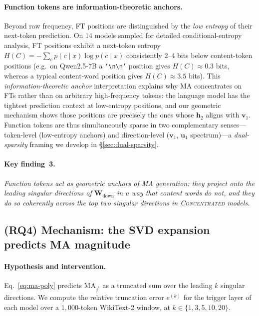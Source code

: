\documentclass{article}
\newcommand{\Wdown}{\mathbf{W}_{\text{down}}}
\newcommand{\ma}{\mathrm{MA}}
\begin{document}
\paragraph{Function tokens are information-theoretic anchors.}
Beyond raw frequency, FT positions are distinguished by the \emph{low
entropy} of their next-token prediction. On $14$ models sampled for
detailed conditional-entropy analysis, FT positions exhibit a
next-token entropy
$H(C) = -\sum_{c} p(c \mid x) \log p(c \mid x)$ consistently $2$--$4$
bits below content-token positions (e.g.\ on Qwen2.5-7B a
\texttt{`\textbackslash n\textbackslash n'} position gives
$H(C) \approx 0.3$ bits, whereas a typical content-word position gives
$H(C) \approx 3.5$ bits). This \emph{information-theoretic anchor}
interpretation explains why MA concentrates on FTs rather than on
arbitrary high-frequency tokens: the language model has the tightest
prediction context at low-entropy positions, and our geometric
mechanism shows those positions are precisely the ones whose
$\mathbf{h}_2$ aligns with $\mathbf{v}_1$. Function tokens are thus
simultaneously sparse in two complementary senses---token-level
(low-entropy anchors) and direction-level ($\mathbf{v}_1$,
$\mathbf{u}_1$ spectrum)---a \emph{dual-sparsity} framing we develop
in \S\ref{sec:dual-sparsity}.

\paragraph{Key finding~3.}
\emph{Function tokens act as geometric anchors of MA generation: they
project onto the leading singular directions of $\Wdown$ in a way that
content words do not, and they do so coherently across the top two
singular directions in \textsc{Concentrated} models.}

\subsection{(RQ4) Mechanism: the SVD expansion predicts MA magnitude}
\label{sec:rq4}

\paragraph{Hypothesis and intervention.}
Eq.~\eqref{eq:ma-poly} predicts $\ma_{j^{*}}$ as a truncated sum over the
leading $k$ singular directions. We compute the relative truncation error
$e^{(k)}$ for the trigger layer of each model over a $1{,}000$-token
WikiText-2 window, at $k \in \{1, 3, 5, 10, 20\}$.
\end{document}
